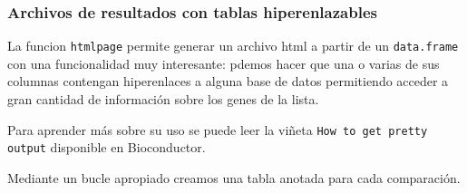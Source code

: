 \documentclass[a4paper]{article}\usepackage[]{graphicx}\usepackage[]{color}
\newcommand{\Rfun}[1]{{\texttt{#1}}}
\begin{document}
\subsubsection{Archivos de resultados con tablas hiperenlazables}

La funcion \Rfun{htmlpage} permite generar un archivo html a partir de un \Rfun{data.frame} con una funcionalidad muy interesante: pdemos hacer que una o varias de sus columnas contengan hiperenlaces a alguna base de datos permitiendo acceder a gran cantidad de información sobre los genes de la lista.

Para aprender más sobre su uso se puede leer la viñeta \texttt{How to get pretty output} disponible en Bioconductor.

Mediante un bucle apropiado creamos una tabla anotada para cada comparaci\'on.
\end{document}
